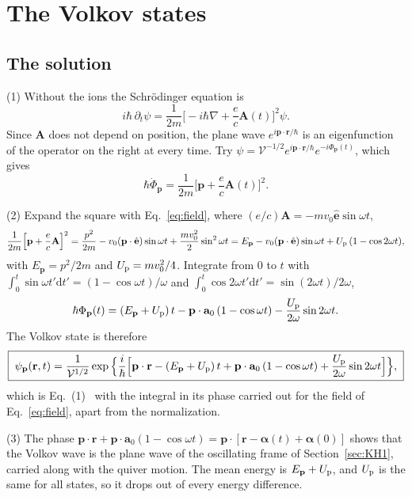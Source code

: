 \documentclass[11pt]{article}
\numberwithin{equation}{section}
\newcommand{\Vol}{\mathcal V}
\newcommand{\ehat}{\hat{\mathbf e}}
\newcommand{\av}{\mathbf a_0}
\newcommand{\pv}{\mathbf p}
\newcommand{\rv}{\mathbf r}
\newcommand{\Av}{\mathbf A}
\newcommand{\Up}{U_{\rm p}}
\newcommand{\dd}{\mathrm d}
\begin{document}
\section{The Volkov states}
\label{sec:volkov}
\subsection{The solution}
{\noindent}(1) Without the ions the Schr\"odinger equation is
\begin{equation}
i\hbar\,\partial_t\psi=\frac{1}{2m}\Big[-i\hbar\nabla+\frac ec\Av(t)\Big]^2\psi.
\end{equation}
Since $\Av$ does not depend on position, the plane wave $e^{i\pv\cdot\rv/\hbar}$
is an eigenfunction of the operator on the right at every time. Try
$\psi=\Vol^{-1/2}e^{i\pv\cdot\rv/\hbar}e^{-i\Phi_{\pv}(t)}$, which gives
\begin{equation}
\hbar\dot\Phi_{\pv}=\frac{1}{2m}\Big[\pv+\frac ec\Av(t)\Big]^2.
\end{equation}

{\noindent}(2) Expand the square with Eq.~\eqref{eq:field}, where
$(e/c)\Av=-mv_0\ehat\sin\omega t$,
\begin{equation}
\frac{1}{2m}\Big[\pv+\frac ec\Av\Big]^2=\frac{p^2}{2m}-v_0(\pv\cdot\ehat)\sin\omega t
+\frac{mv_0^2}{2}\sin^2\omega t
=E_{\pv}-v_0(\pv\cdot\ehat)\sin\omega t+\Up\,(1-\cos2\omega t),
\end{equation}
with $E_{\pv}=p^2/2m$ and $\Up=mv_0^2/4$. Integrate from $0$ to $t$ with
$\int_0^t\sin\omega t'\dd t'=(1-\cos\omega t)/\omega$ and
$\int_0^t\cos2\omega t'\dd t'=\sin(2\omega t)/2\omega$,
\begin{equation}
\hbar\Phi_{\pv}(t)=(E_{\pv}+\Up)\,t-\pv\cdot\av\,(1-\cos\omega t)-\frac{\Up}{2\omega}\sin2\omega t.
\end{equation}
The Volkov state is therefore \cite{Volkov1935}
\begin{equation}
\boxed{\;\psi_{\pv}(\rv,t)=\frac{1}{\Vol^{1/2}}\exp\Big\{\frac{i}{\hbar}\Big[\pv\cdot\rv-(E_{\pv}+\Up)\,t
+\pv\cdot\av\,(1-\cos\omega t)+\frac{\Up}{2\omega}\sin2\omega t\Big]\Big\},\;}
\label{eq:volkov}
\end{equation}
which is Eq.~(1)~\cite{BunkinFedorov1966} with the integral in its phase
carried out for the field of Eq.~\eqref{eq:field}, apart from the
normalization.

{\noindent}(3) The phase $\pv\cdot\rv+\pv\cdot\av(1-\cos\omega t)
=\pv\cdot[\rv-\boldsymbol\alpha(t)+\boldsymbol\alpha(0)]$ shows that the Volkov
wave is the plane wave of the oscillating frame of Section~\ref{sec:KH1},
carried along with the quiver motion. The mean energy is $E_{\pv}+\Up$, and
$\Up$ is the same for all states, so it drops out of every energy
difference.
\end{document}
